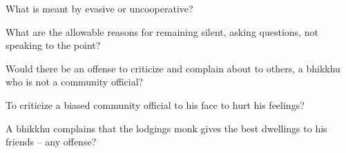 
What is meant by evasive or uncooperative? 

\bigskip

% 

What are the allowable reasons for remaining silent, asking questions, not speaking to the point?

\bigskip



Would there be an offense to criticize and complain about to others, a bhikkhu
who is not a community official?

\bigskip


To criticize a biased community official to his face to hurt his feelings?

\bigskip


A bhikkhu complains that the lodgings monk gives the best dwellings to his friends – any offense?

\bigskip



